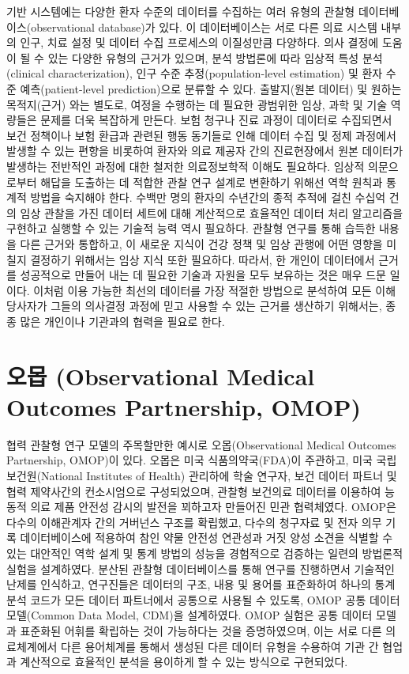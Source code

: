 \documentclass[11pt]{book}
\theoremstyle{definition}
\theoremstyle{definition}
\theoremstyle{definition}
\theoremstyle{remark}
\begin{document}
기반 시스템에는 다양한 환자 수준의 데이터를 수집하는 여러 유형의 관찰형
데이터베이스(observational database)가 있다. 이 데이터베이스는 서로 다른
의료 시스템 내부의 인구, 치료 설정 및 데이터 수집 프로세스의 이질성만큼
다양하다. 의사 결정에 도움이 될 수 있는 다양한 유형의 근거가 있으며,
분석 방법론에 따라 임상적 특성 분석(clinical characterization), 인구
수준 추정(population-level estimation) 및 환자 수준 예측(patient-level
prediction)으로 분류할 수 있다. 출발지(원본 데이터) 및 원하는
목적지(근거) 와는 별도로, 여정을 수행하는 데 필요한 광범위한 임상, 과학
및 기술 역량들은 문제를 더욱 복잡하게 만든다. 보험 청구나 진료 과정이
데이터로 수집되면서 보건 정책이나 보험 환급과 관련된 행동 동기들로 인해
데이터 수집 및 정제 과정에서 발생할 수 있는 편향을 비롯하여 환자와 의료
제공자 간의 진료현장에서 원본 데이터가 발생하는 전반적인 과정에 대한
철저한 의료정보학적 이해도 필요하다. 임상적 의문으로부터 해답을 도출하는
데 적합한 관찰 연구 설계로 변환하기 위해선 역학 원칙과 통계적 방법을
숙지해야 한다. 수백만 명의 환자의 수년간의 종적 추적에 걸친 수십억 건의
임상 관찰을 가진 데이터 세트에 대해 계산적으로 효율적인 데이터 처리
알고리즘을 구현하고 실행할 수 있는 기술적 능력 역시 필요하다. 관찰형
연구를 통해 습득한 내용을 다른 근거와 통합하고, 이 새로운 지식이 건강
정책 및 임상 관행에 어떤 영향을 미칠지 결정하기 위해서는 임상 지식 또한
필요하다. 따라서, 한 개인이 데이터에서 근거를 성공적으로 만들어 내는 데
필요한 기술과 자원을 모두 보유하는 것은 매우 드문 일이다. 이처럼 이용
가능한 최선의 데이터를 가장 적절한 방법으로 분석하여 모든 이해당사자가
그들의 의사결정 과정에 믿고 사용할 수 있는 근거를 생산하기 위해서는,
종종 많은 개인이나 기관과의 협력을 필요로 한다.

\section{오몹 (Observational Medical Outcomes Partnership,
OMOP)}\label{-observational-medical-outcomes-partnership-omop}

협력 관찰형 연구 모델의 주목할만한 예시로 오몹(Observational Medical
Outcomes Partnership, OMOP)이 있다. 오몹은 미국 식품의약국(FDA)이
주관하고, 미국 국립 보건원(National Institutes of Health) 관리하에 학술
연구자, 보건 데이터 파트너 및 협력 제약사간의 컨소시엄으로 구성되었으며,
관찰형 보건의료 데이터를 이용하여 능동적 의료 제품 안전성 감시의 발전을
꾀하고자 만들어진 민관 협력체였다. \citep{stang2010omop} OMOP은 다수의
이해관계자 간의 거버넌스 구조를 확립했고, 다수의 청구자료 및 전자 의무
기록 데이터베이스에 적용하여 참인 약물 안전성 연관성과 거짓 양성 소견을
식별할 수 있는 대안적인 역학 설계 및 통계 방법의 성능을 경험적으로
검증하는 일련의 방법론적 실험을 설계하였다. 분산된 관찰형 데이터베이스를
통해 연구를 진행하면서 기술적인 난제를 인식하고, 연구진들은 데이터의
구조, 내용 및 용어를 표준화하여 하나의 통계 분석 코드가 모든 데이터
파트너에서 공통으로 사용될 수 있도록, OMOP 공통 데이터 모델(Common Data
Model, CDM)을 설계하였다. \citep{overhage2012cdm} OMOP 실험은 공통
데이터 모델과 표준화된 어휘를 확립하는 것이 가능하다는 것을
증명하였으며, 이는 서로 다른 의료체계에서 다른 용어체계를 통해서 생성된
다른 데이터 유형을 수용하여 기관 간 협업과 계산적으로 효율적인 분석을
용이하게 할 수 있는 방식으로 구현되었다.
\end{document}
